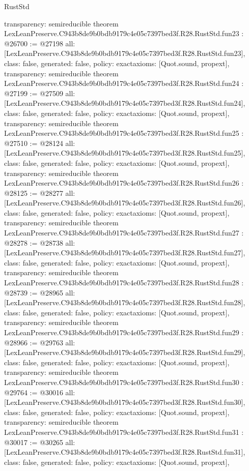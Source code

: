 \begin{lexlean}{RustStd}
\begin{coremodule}
{  transparency: semireducible
}
theorem LexLeanPreserve.C943b8de9b0bdb9179c4e05c7397bed3f.R28.RustStd.fun23 : @26700 := @27198 {
  all: [LexLeanPreserve.C943b8de9b0bdb9179c4e05c7397bed3f.R28.RustStd.fun23],
  class: false,
  generated: false,
  policy: exact{axioms: [Quot.sound, propext]},
  transparency: semireducible
}
theorem LexLeanPreserve.C943b8de9b0bdb9179c4e05c7397bed3f.R28.RustStd.fun24 : @27199 := @27509 {
  all: [LexLeanPreserve.C943b8de9b0bdb9179c4e05c7397bed3f.R28.RustStd.fun24],
  class: false,
  generated: false,
  policy: exact{axioms: [Quot.sound, propext]},
  transparency: semireducible
}
theorem LexLeanPreserve.C943b8de9b0bdb9179c4e05c7397bed3f.R28.RustStd.fun25 : @27510 := @28124 {
  all: [LexLeanPreserve.C943b8de9b0bdb9179c4e05c7397bed3f.R28.RustStd.fun25],
  class: false,
  generated: false,
  policy: exact{axioms: [Quot.sound, propext]},
  transparency: semireducible
}
theorem LexLeanPreserve.C943b8de9b0bdb9179c4e05c7397bed3f.R28.RustStd.fun26 : @28125 := @28277 {
  all: [LexLeanPreserve.C943b8de9b0bdb9179c4e05c7397bed3f.R28.RustStd.fun26],
  class: false,
  generated: false,
  policy: exact{axioms: [Quot.sound, propext]},
  transparency: semireducible
}
theorem LexLeanPreserve.C943b8de9b0bdb9179c4e05c7397bed3f.R28.RustStd.fun27 : @28278 := @28738 {
  all: [LexLeanPreserve.C943b8de9b0bdb9179c4e05c7397bed3f.R28.RustStd.fun27],
  class: false,
  generated: false,
  policy: exact{axioms: [Quot.sound, propext]},
  transparency: semireducible
}
theorem LexLeanPreserve.C943b8de9b0bdb9179c4e05c7397bed3f.R28.RustStd.fun28 : @28739 := @28965 {
  all: [LexLeanPreserve.C943b8de9b0bdb9179c4e05c7397bed3f.R28.RustStd.fun28],
  class: false,
  generated: false,
  policy: exact{axioms: [Quot.sound, propext]},
  transparency: semireducible
}
theorem LexLeanPreserve.C943b8de9b0bdb9179c4e05c7397bed3f.R28.RustStd.fun29 : @28966 := @29763 {
  all: [LexLeanPreserve.C943b8de9b0bdb9179c4e05c7397bed3f.R28.RustStd.fun29],
  class: false,
  generated: false,
  policy: exact{axioms: [Quot.sound, propext]},
  transparency: semireducible
}
theorem LexLeanPreserve.C943b8de9b0bdb9179c4e05c7397bed3f.R28.RustStd.fun30 : @29764 := @30016 {
  all: [LexLeanPreserve.C943b8de9b0bdb9179c4e05c7397bed3f.R28.RustStd.fun30],
  class: false,
  generated: false,
  policy: exact{axioms: [Quot.sound, propext]},
  transparency: semireducible
}
theorem LexLeanPreserve.C943b8de9b0bdb9179c4e05c7397bed3f.R28.RustStd.fun31 : @30017 := @30265 {
  all: [LexLeanPreserve.C943b8de9b0bdb9179c4e05c7397bed3f.R28.RustStd.fun31],
  class: false,
  generated: false,
  policy: exact{axioms: [Quot.sound, propext]},
}
\end{coremodule}
\end{lexlean}
